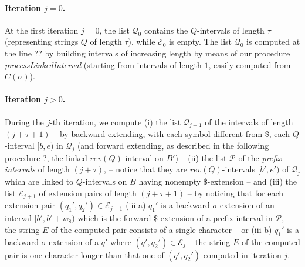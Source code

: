 \documentclass[runningheads,envcountsame,a4paper]{llncs}
\begin{document}


\paragraph{Iteration $j = 0$.}

At the first iteration $j=0$, the list $\mathcal{Q}_0$ contains the
$Q$-intervals of length $\tau$ (representing strings $Q$ of length $\tau$), while  $\mathcal{E}_0$ is  empty. The list $\mathcal{Q}_0$ is computed at the line ?? by building intervals of increasing length by means of our procedure \emph{processLinkedInterval} (starting from intervals of length $1$, easily computed from $C(\sigma)$).


\paragraph{Iteration $j > 0$.}
During the $j$-th iteration, we compute
(i) the list $\mathcal{Q}_{j+1}$ of the
intervals of length $(j+\tau+1)$  -- by backward extending, with each symbol different from \$, each $Q$-interval $[b, e)$ in $\mathcal{Q}_{j}$ (and forward extending, as described in the following procedure ?, the
linked $rev(Q)$-interval on $B'$)  --
(ii) the list $\mathcal{P}$ of the
\emph{prefix-intervals} of length $(j+\tau)$, -- notice that they are $rev(Q)$-intervals $[b',e')$ of $\mathcal{Q}_j$ which are linked to $Q$-intervals on $B$ having nonempty \$-extension   --
and
(iii) the list $\mathcal{E}_{j+1}$ of
extension pairs of length $(j+\tau+1)$ -- by noticing that for each extension pair
$(q_{1}',q_{2}')\in \mathcal{E}_{j+1}$ (iii a) $q_{1}'$ is a backward $\sigma$-extension
of an interval $[b',b'+w_\$)$ which is the forward \$-extension of a prefix-interval in $\mathcal{P}$,  -- the string $E$ of the computed pair consists of a single character -- or  (iii b)
$q_{1}'$ is a backward $\sigma$-extension
of a $q'$ where $(q',q_{2}')\in \mathcal{E}_{j}$ -- the string $E$ of the computed pair is one
character longer than that one of $(q', q_{2}')$ computed in iteration $j$.


\end{document}
